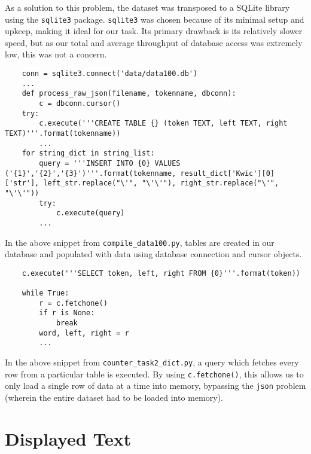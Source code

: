 \documentclass{article}      %
\begin{document}
	As a solution to this problem, the dataset was transposed to a SQLite library using the \texttt{sqlite3} package. \texttt{sqlite3} was chosen because of its minimal setup and upkeep, making it ideal for our task. Its primary drawback is its relatively slower speed, but as our total and average throughput of database access was extremely low, this was not a concern.
	
	\begin{verbatim}
	conn = sqlite3.connect('data/data100.db')
	...
	def process_raw_json(filename, tokenname, dbconn):
		c = dbconn.cursor()
	try:
		c.execute('''CREATE TABLE {} (token TEXT, left TEXT, right TEXT)'''.format(tokenname))
		...
	for string_dict in string_list:
		query = '''INSERT INTO {0} VALUES ('{1}','{2}','{3}')'''.format(tokenname, result_dict['Kwic'][0]['str'], left_str.replace("\'", "\'\'"), right_str.replace("\'", "\'\'"))
		try:
			c.execute(query)
		...
	\end{verbatim}
	
	In the above snippet from \texttt{compile\_data100.py}, tables are created in our database and populated with data using database connection and cursor objects.
	
	\begin{verbatim}
	c.execute('''SELECT token, left, right FROM {0}'''.format(token))
	
	while True:
		r = c.fetchone()
		if r is None:
			break
		word, left, right = r
		...
	\end{verbatim}
	
	In the above snippet from \texttt{counter\_task2\_dict.py}, a query which fetches every row from a particular table is executed. By using \texttt{c.fetchone()}, this allows us to only load a single row of data at a time into memory, bypassing the \texttt{json} problem (wherein the entire dataset had to be loaded into memory).
	
	\section{Displayed Text}
	
\end{document}
